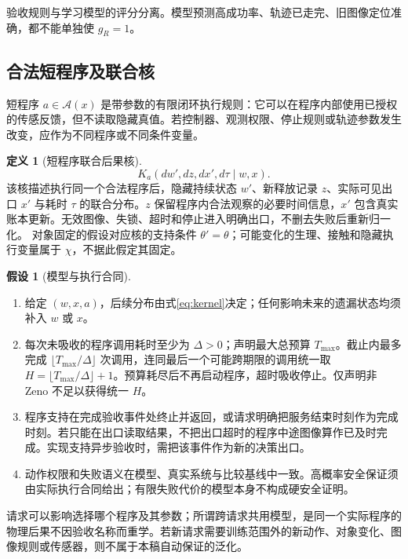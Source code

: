 \documentclass[11pt,a4paper,fontset=fandol]{ctexart}
\theoremstyle{definition}
\newtheorem{definition}[theorem]{定义}
\newtheorem{assumption}[theorem]{假设}
\theoremstyle{remark}
\numberwithin{equation}{section}
\newcommand{\cA}{\mathcal A}
\begin{document}
验收规则与学习模型的评分分离。模型预测高成功率、轨迹已走完、旧图像定位准确，都不能单独使 $g_R=1$。

\subsection{合法短程序及联合核}
短程序 $a\in\cA(x)$ 是带参数的有限闭环执行规则：它可以在程序内部使用已授权的传感反馈，但不读取隐藏真值。若控制器、观测权限、停止规则或轨迹参数发生改变，应作为不同程序或不同条件变量。

\begin{definition}[短程序联合后果核]
\begin{equation}
 \boxed{K_a(dw',dz,dx',d\tau\mid w,x).}
 \label{eq:kernel}
\end{equation}
该核描述执行同一个合法程序后，隐藏持续状态 $w'$、新释放记录 $z$、实际可见出口 $x'$ 与耗时 $\tau$ 的联合分布。$z$ 保留程序内合法观察的必要时间信息，$x'$ 包含真实账本更新。无效图像、失锁、超时和停止进入明确出口，不删去失败后重新归一化。
对象固定的假设对应核的支持条件 $\theta'=\theta$；可能变化的生理、接触和隐藏执行变量属于 $\chi$，不据此假定其固定。
\end{definition}

\begin{assumption}[模型与执行合同]
\label{ass:model}
\begin{enumerate}
\item 给定 $(w,x,a)$，后续分布由式\eqref{eq:kernel}决定；任何影响未来的遗漏状态均须补入 $w$ 或 $x$。
\item 每次未吸收的程序调用耗时至少为 $\Delta>0$；声明最大总预算 $T_{\max}$。截止内最多完成 $\lfloor T_{\max}/\Delta\rfloor$ 次调用，连同最后一个可能跨期限的调用统一取 $H=\lfloor T_{\max}/\Delta\rfloor+1$。预算耗尽后不再启动程序，超时吸收停止。仅声明非 Zeno 不足以获得统一 $H$。
\item 程序支持在完成验收事件处终止并返回，或请求明确把服务结束时刻作为完成时刻。若只能在出口读取结果，不把出口超时的程序中途图像算作已及时完成。实现支持异步验收时，需把该事件作为新的决策出口。
\item 动作权限和失败语义在模型、真实系统与比较基线中一致。高概率安全保证须由实际执行合同给出；有限失败代价的模型本身不构成硬安全证明。
\end{enumerate}
\end{assumption}

请求可以影响选择哪个程序及其参数；所谓跨请求共用模型，是同一个实际程序的物理后果不因验收名称而重学。若新请求需要训练范围外的新动作、对象变化、图像规则或传感器，则不属于本稿自动保证的泛化。
\end{document}
